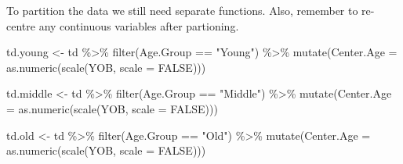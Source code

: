 \documentclass[
  12pt,
  letterpaper]{article}
\newenvironment{Shaded}{\begin{snugshade}}{\end{snugshade}}
\newcommand{\AttributeTok}[1]{\textcolor[rgb]{0.40,0.45,0.13}{#1}}
\newcommand{\ConstantTok}[1]{\textcolor[rgb]{0.56,0.35,0.01}{#1}}
\newcommand{\FunctionTok}[1]{\textcolor[rgb]{0.28,0.35,0.67}{#1}}
\newcommand{\NormalTok}[1]{\textcolor[rgb]{0.00,0.23,0.31}{#1}}
\newcommand{\OtherTok}[1]{\textcolor[rgb]{0.00,0.23,0.31}{#1}}
\newcommand{\SpecialCharTok}[1]{\textcolor[rgb]{0.37,0.37,0.37}{#1}}
\newcommand{\StringTok}[1]{\textcolor[rgb]{0.13,0.47,0.30}{#1}}
\begin{document}
To partition the data we still need separate functions. Also, remember
to re-centre any continuous variables after partioning.

\begin{Shaded}
\begin{Highlighting}[]
\NormalTok{td.young }\OtherTok{\textless{}{-}}\NormalTok{ td }\SpecialCharTok{\%\textgreater{}\%}
    \FunctionTok{filter}\NormalTok{(Age.Group }\SpecialCharTok{==} \StringTok{"Young"}\NormalTok{) }\SpecialCharTok{\%\textgreater{}\%}
    \FunctionTok{mutate}\NormalTok{(}\AttributeTok{Center.Age =} \FunctionTok{as.numeric}\NormalTok{(}\FunctionTok{scale}\NormalTok{(YOB, }\AttributeTok{scale =} \ConstantTok{FALSE}\NormalTok{)))}

\NormalTok{td.middle }\OtherTok{\textless{}{-}}\NormalTok{ td }\SpecialCharTok{\%\textgreater{}\%}
    \FunctionTok{filter}\NormalTok{(Age.Group }\SpecialCharTok{==} \StringTok{"Middle"}\NormalTok{) }\SpecialCharTok{\%\textgreater{}\%}
    \FunctionTok{mutate}\NormalTok{(}\AttributeTok{Center.Age =} \FunctionTok{as.numeric}\NormalTok{(}\FunctionTok{scale}\NormalTok{(YOB, }\AttributeTok{scale =} \ConstantTok{FALSE}\NormalTok{)))}

\NormalTok{td.old }\OtherTok{\textless{}{-}}\NormalTok{ td }\SpecialCharTok{\%\textgreater{}\%}
    \FunctionTok{filter}\NormalTok{(Age.Group }\SpecialCharTok{==} \StringTok{"Old"}\NormalTok{) }\SpecialCharTok{\%\textgreater{}\%}
    \FunctionTok{mutate}\NormalTok{(}\AttributeTok{Center.Age =} \FunctionTok{as.numeric}\NormalTok{(}\FunctionTok{scale}\NormalTok{(YOB, }\AttributeTok{scale =} \ConstantTok{FALSE}\NormalTok{)))}
\end{Highlighting}
\end{Shaded}
\end{document}

